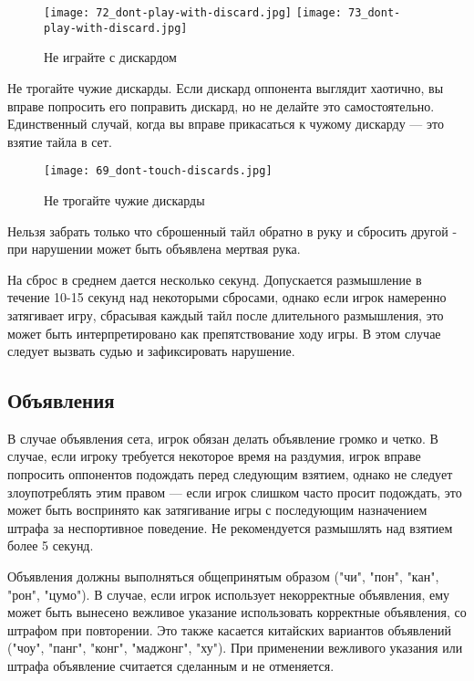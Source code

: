 \begin{figure}[H]
	\centering
	\texttt{[image: 72\_dont-play-with-discard.jpg]}
	\texttt{[image: 73\_dont-play-with-discard.jpg]}
	\caption{Не играйте с дискардом}
\end{figure}

Не трогайте чужие дискарды. Если дискард оппонента выглядит хаотично, вы вправе попросить его поправить дискард, но не делайте это самостоятельно. Единственный случай, когда вы вправе прикасаться к чужому дискарду --- это взятие тайла в сет.

\begin{figure}[H]
	\centering
	\texttt{[image: 69\_dont-touch-discards.jpg]}
	\caption{Не трогайте чужие дискарды}
\end{figure}

Нельзя забрать только что сброшенный тайл обратно в руку и сбросить другой - при нарушении может быть объявлена мертвая рука.

На сброс в среднем дается несколько секунд. Допускается размышление в течение 10-15 секунд над некоторыми сбросами, однако если игрок намеренно затягивает игру, сбрасывая каждый тайл после длительного размышления, это может быть интерпретировано как препятствование ходу игры. В этом случае следует вызвать судью и зафиксировать нарушение.

\subsection{Объявления}

В случае объявления сета, игрок обязан делать объявление громко и четко. В случае, если игроку требуется некоторое время на раздумия, игрок вправе попросить оппонентов подождать перед следующим взятием, однако не следует злоупотреблять этим правом --- если игрок слишком часто просит подождать, это может быть воспринято как затягивание игры с последующим назначением штрафа за неспортивное поведение. Не рекомендуется размышлять над взятием более 5 секунд.

Объявления должны выполняться общепринятым образом ("чи", "пон", "кан", "рон", "цумо"). В случае, если игрок использует некорректные объявления, ему может быть вынесено вежливое указание использовать корректные объявления, со штрафом при повторении. Это также касается китайских вариантов объявлений ("чоу", "панг", "конг", "маджонг", "ху"). При применении вежливого указания или штрафа объявление считается сделанным и не отменяется.

